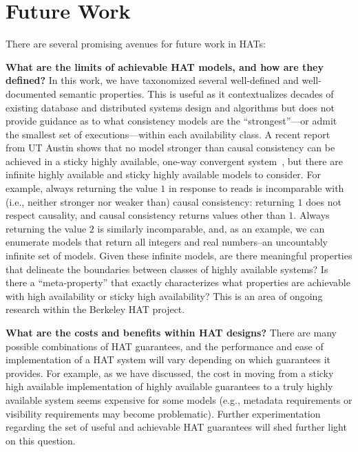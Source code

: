 
\section{Future Work}
\label{sec:futurework}

There are several promising avenues for future work in HATs:

\textbf{What are the limits of achievable HAT models, and how are they
  defined?}  In this work, we have taxonomized several well-defined
and well-documented semantic properties. This is useful as it
contextualizes decades of existing database and distributed systems
design and algorithms but does not provide guidance as to what
consistency models are the ``strongest''---or admit the smallest set
of executions---within each availability class. A recent report from
UT Austin shows that no model stronger than causal consistency can be
achieved in a sticky highly available, one-way convergent
system~\cite{cac}, but there are infinite highly available and sticky
highly available models to consider. For example, always returning the
value $1$ in response to reads is incomparable with (i.e., neither
stronger nor weaker than) causal consistency: returning $1$ does not
respect causality, and causal consistency returns values other than
$1$. Always returning the value $2$ is similarly incomparable, and, as
an example, we can enumerate models that return all integers and real
numbers--an uncountably infinite set of models. Given these infinite
models, are there meaningful properties that delineate the boundaries
between classes of highly available systems? Is there a
``meta-property'' that exactly characterizes what properties are
achievable with high availability or sticky high availability? This is
an area of ongoing research within the Berkeley HAT project. 

\textbf{What are the costs and benefits within HAT designs?} There are
many possible combinations of HAT guarantees, and the performance and
ease of implementation of a HAT system will vary depending on which
guarantees it provides. For example, as we have discussed, the cost in
moving from a sticky high available implementation of highly available
guarantees to a truly highly available system seems expensive for some
models (e.g., metadata requirements or visibility requirements may
become problematic). Further experimentation regarding the set of
useful and achievable HAT guarantees will shed further light on this
question.

